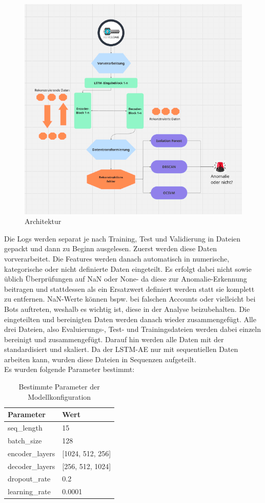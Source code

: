 \documentclass[a4paper,12pt]{article}
\begin{document}
	\begin{figure}[H]
		\centering
		\includegraphics[width=0.7\linewidth]{screenshot001}
		\caption{Architektur}
		\label{fig:screenshot001}
	\end{figure}
	
	Die Logs werden separat je nach Training, Test und Validierung in Dateien gepackt und dann zu Beginn ausgelesen. Zuerst werden diese Daten vorverarbeitet. Die Features werden danach automatisch in numerische, kategorische oder nicht definierte Daten eingeteilt. Es erfolgt dabei nicht sowie üblich Überprüfungen auf NaN oder None- da diese zur Anomalie-Erkennung beitragen und stattdessen als ein Ersatzwert definiert werden statt sie komplett zu entfernen. NaN-Werte können bspw. bei falschen Accounts oder vielleicht bei Bots auftreten, weshalb es wichtig ist, diese in der Analyse beizubehalten. Die eingeteilten und bereinigten Daten werden danach wieder zusammengefügt. Alle drei Dateien, also Evaluierungs-, Test- und Trainingsdateien werden dabei einzeln bereinigt und zusammengefügt. Darauf hin werden alle Daten mit der standardisiert und skaliert. Da der LSTM-AE nur mit sequentiellen Daten arbeiten kann, wurden diese Dateien in Sequenzen aufgeteilt.
	\\[0.5em]
	Es wurden folgende Parameter bestimmt:
	
	\begin{table}[h]
		\centering
		\begin{tabular}{ll}
			\toprule
			\textbf{Parameter}       & \textbf{Wert}            \\
			\midrule
			seq\_length             & 15                       \\
			batch\_size             & 128                      \\
			encoder\_layers         & [1024, 512, 256]         \\
			decoder\_layers         & [256, 512, 1024]         \\
			dropout\_rate           & 0.2                      \\
			learning\_rate          & 0.0001                   \\
			\bottomrule
		\end{tabular}
		\caption{Bestimmte Parameter der Modellkonfiguration}
		\label{tab:model_params}
	\end{table}
	
\end{document}
